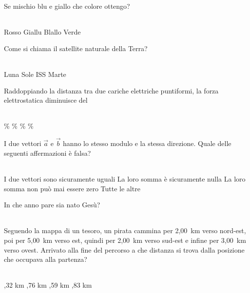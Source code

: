 \documentclass[a4paper,11pt]{exam}
\begin{document}
\begin{questions}

    
\question Se mischio blu e giallo che colore ottengo?\\\
\begin{oneparchoices}
  \choice Rosso
  \choice Giallu
  \choice Blallo
  \choice Verde
\end{oneparchoices}

    
\question Come si chiama il satellite naturale della Terra?\\\
\begin{oneparchoices}
  \choice Luna
  \choice Sole
  \choice ISS
  \choice Marte
\end{oneparchoices}

    
\question Raddoppiando la distanza tra due cariche elettriche puntiformi, la forza elettrostatica diminuisce del\\\
\begin{oneparchoices}
  \choice 75\%
  \choice 25\%
  \%
  \%
\end{oneparchoices}

    
\question I due vettori $\vec{a}$ e $\vec{b}$ hanno lo stesso modulo e la stessa direzione. Quale delle seguenti affermazioni è falsa?\\\
\begin{oneparchoices}
  \choice I due vettori sono sicuramente uguali
  \choice La loro somma è sicuramente nulla
  \choice La loro somma non può mai essere zero
  \choice Tutte le altre
\end{oneparchoices}

    
\question In che anno pare sia nato Gesù?\\\
\begin{oneparchoices}
  \choice 0
  \choice 20
  \choice 2019
  \choice -80
\end{oneparchoices}

    
\question Seguendo la mappa di un tesoro, un pirata cammina per 2,00~km verso nord-est, poi per 5,00~km verso est, quindi per 2,00~km verso sud-est e infine per 3,00~km verso ovest. Arrivato alla fine del percorso a che distanza si trova dalla posizione che occupava alla partenza?\\\
\begin{oneparchoices}
  \choice 6,32 km
  ,76 km
  ,59 km
  \choice 4,83 km
\end{oneparchoices}


\end{questions}
\end{document}
